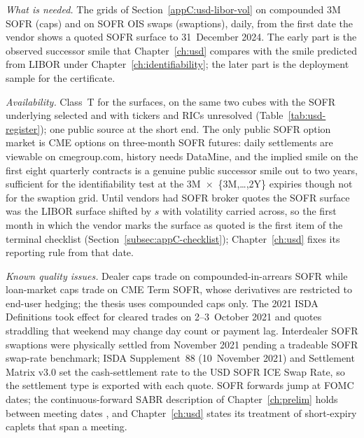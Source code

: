 \emph{What is needed.} The grids of Section~\ref{appC:usd-libor-vol} on compounded 3M SOFR (caps) and on SOFR OIS swaps (swaptions), daily, from the first date the vendor shows a quoted SOFR surface to 31~December 2024. The early part is the observed successor smile that Chapter~\ref{ch:usd} compares with the smile predicted from LIBOR under Chapter~\ref{ch:identifiability}; the later part is the deployment sample for the certificate.

\emph{Availability.} Class~T for the surfaces, on the same two cubes with the SOFR underlying selected and with tickers and RICs unresolved (Table~\ref{tab:usd-register}); one public source at the short end. The only public SOFR option market is CME options on three-month SOFR futures: daily settlements are viewable on cmegroup.com, history needs DataMine, and the implied smile on the first eight quarterly contracts is a genuine public successor smile out to two years, sufficient for the identifiability test at the 3M~$\times$~\{3M,\ldots,2Y\} expiries though not for the swaption grid. Until vendors had SOFR broker quotes the SOFR surface was the LIBOR surface shifted by $s$ with volatility carried across, so the first month in which the vendor marks the surface as quoted is the first item of the terminal checklist (Section~\ref{subsec:appC-checklist}); Chapter~\ref{ch:usd} fixes its reporting rule from that date.

\emph{Known quality issues.} Dealer caps trade on compounded-in-arrears SOFR while loan-market caps trade on CME Term SOFR, whose derivatives are restricted to end-user hedging; the thesis uses compounded caps only. The 2021 ISDA Definitions took effect for cleared trades on 2--3~October 2021 and quotes straddling that weekend may change day count or payment lag. Interdealer SOFR swaptions were physically settled from November 2021 pending a tradeable SOFR swap-rate benchmark; ISDA Supplement~88 (10~November 2021) and Settlement Matrix v3.0 set the cash-settlement rate to the USD SOFR ICE Swap Rate, so the settlement type is exported with each quote. SOFR forwards jump at FOMC dates; the continuous-forward SABR description of Chapter~\ref{ch:prelim} holds between meeting dates \citep{brace2024}, and Chapter~\ref{ch:usd} states its treatment of short-expiry caplets that span a meeting.


